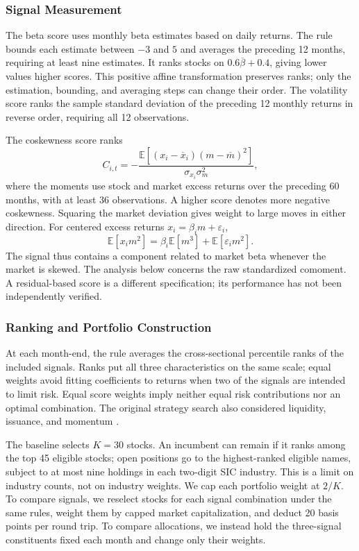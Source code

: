 \documentclass[letterpaper,journal]{IEEEtran}
\newcommand{\E}{\mathbb{E}}
\begin{document}
\subsubsection{Signal Measurement}
The beta score uses monthly beta estimates based on daily returns. The rule bounds each estimate between $-3$ and $5$ and averages the preceding 12 months, requiring at least nine estimates. It ranks stocks on $0.6\overline\beta+0.4$, giving lower values higher scores. This positive affine transformation preserves ranks; only the estimation, bounding, and averaging steps can change their order. The volatility score ranks the sample standard deviation of the preceding 12 monthly returns in reverse order, requiring all 12 observations.

The coskewness score ranks
\begin{equation}
 C_{i,t}=-\frac{\E[(x_i-\overline x_i)(m-\overline m)^2]}
 {\sigma_{x_i}\sigma_m^2},
\end{equation}
where the moments use stock and market excess returns over the preceding 60 months, with at least 36 observations. A higher score denotes more negative coskewness. Squaring the market deviation gives weight to large moves in either direction. For centered excess returns $x_i=\beta_i m+\varepsilon_i$,
\begin{equation}
 \E[x_i m^2]=\beta_i\E[m^3]+\E[\varepsilon_i m^2].
\end{equation}
The signal thus contains a component related to market beta whenever the market is skewed. The analysis below concerns the raw standardized comoment. A residual-based score is a different specification; its performance has not been independently verified.

\subsubsection{Ranking and Portfolio Construction}
At each month-end, the rule averages the cross-sectional percentile ranks of the included signals. Ranks put all three characteristics on the same scale; equal weights avoid fitting coefficients to returns when two of the signals are intended to limit risk. Equal score weights imply neither equal risk contributions nor an optimal combination. The original strategy search also considered liquidity, issuance, and momentum \cite{teamrecord}.

The baseline selects $K=30$ stocks. An incumbent can remain if it ranks among the top 45 eligible stocks; open positions go to the highest-ranked eligible names, subject to at most nine holdings in each two-digit SIC industry. This is a limit on industry counts, not on industry weights. We cap each portfolio weight at $2/K$. To compare signals, we reselect stocks for each signal combination under the same rules, weight them by capped market capitalization, and deduct 20 basis points per round trip. To compare allocations, we instead hold the three-signal constituents fixed each month and change only their weights.
\end{document}

